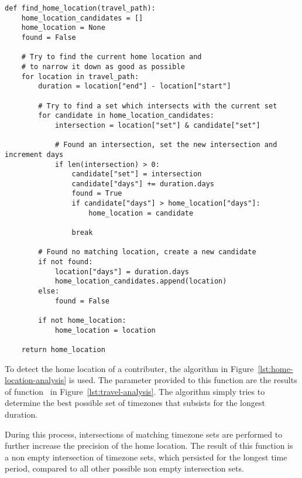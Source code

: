 \begin{verbatim}
def find_home_location(travel_path):
    home_location_candidates = []
    home_location = None
    found = False

    # Try to find the current home location and
    # to narrow it down as good as possible
    for location in travel_path:
        duration = location["end"] - location["start"]

        # Try to find a set which intersects with the current set
        for candidate in home_location_candidates:
            intersection = location["set"] & candidate["set"]

            # Found an intersection, set the new intersection and increment days
            if len(intersection) > 0:
                candidate["set"] = intersection
                candidate["days"] += duration.days
                found = True
                if candidate["days"] > home_location["days"]:
                    home_location = candidate

                break

        # Found no matching location, create a new candidate
        if not found:
            location["days"] = duration.days
            home_location_candidates.append(location)
        else:
            found = False

        if not home_location:
            home_location = location

    return home_location
\end{verbatim}
\begingroup
{}\label{lst:home-location-analysis}
\endgroup

To detect the home location of a contributer, the algorithm in Figure~\ref{lst:home-location-analysis} is used.
The parameter provided to this function are the results of function~ in Figure~\ref{lst:travel-analysis}.
The algorithm simply tries to determine the best possible set of timezones that subsists for the longest duration.

During this process, intersections of matching timezone sets are performed to further increase the precision of the home location.
The result of this function is a non empty intersection of timezone sets, which persisted for the longest time period, compared to all other possible non empty intersection sets.
